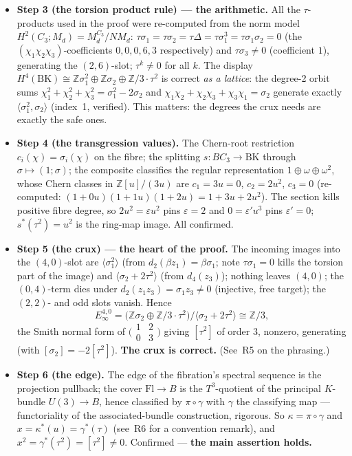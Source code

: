 \documentclass[11pt,a4paper]{article}
\newcommand{\Z}{\mathbb{Z}}
\newcommand{\BK}{\mathrm{BK}}
\newcommand{\Fl}{\mathrm{Fl}}
\begin{document}
\begin{itemize}[leftmargin=1.4em,itemsep=2pt]
\item \textbf{Step 3 (the torsion product rule) --- the arithmetic.} All the
$\tau$-products used in the proof were re-computed from the norm model
$H^2(C_3;M_d)=M_d^{C_3}/NM_d$: $\tau\sigma_1=\tau\sigma_2=\tau\Delta=
\tau\sigma_1^3=\tau\sigma_1\sigma_2=0$ (the $(\chi_1\chi_2\chi_3)$-coefficients
$0,0,0,6,3$ respectively) and $\tau\sigma_3\ne0$ (coefficient $1$),
generating the $(2,6)$-slot; $\tau^k\ne0$ for all $k$. The display
$H^4(\BK)\cong\Z\sigma_1^2\oplus\Z\sigma_2\oplus\Z/3\cdot\tau^2$ is correct
\emph{as a lattice}: the degree-2 orbit sums
$\chi_1^2+\chi_2^2+\chi_3^2=\sigma_1^2-2\sigma_2$ and
$\chi_1\chi_2+\chi_2\chi_3+\chi_3\chi_1=\sigma_2$ generate exactly
$\langle\sigma_1^2,\sigma_2\rangle$ (index~1, verified). This matters: the
degrees the crux needs are exactly the safe ones.

\item \textbf{Step 4 (the transgression values).} The Chern-root restriction
$c_i(\chi)=\sigma_i(\chi)$ on the fibre; the splitting $s\colon BC_3\to\BK$
through $\sigma\mapsto(1;\sigma)$; the composite classifies the regular
representation $1\oplus\omega\oplus\omega^2$, whose Chern classes in
$\Z[u]/(3u)$ are $c_1=3u=0$, $c_2=2u^2$, $c_3=0$ (re-computed:
$(1+0u)(1+1u)(1+2u)=1+3u+2u^2$). The section kills positive fibre degree, so
$2u^2=\varepsilon u^2$ pins \textbf{$\varepsilon=2$} and $0=\varepsilon'u^3$
pins \textbf{$\varepsilon'=0$}; $s^*(\tau^2)=u^2$ is the ring-map image. All
confirmed.

\item \textbf{Step 5 (the crux) --- the heart of the proof.} The incoming
images into the $(4,0)$-slot are $\langle\sigma_1^2\rangle$ (from
$d_2(\beta z_1)=\beta\sigma_1$; note $\tau\sigma_1=0$ kills the torsion part
of the image) and $\langle\sigma_2+2\tau^2\rangle$ (from $d_4(z_3)$); nothing
leaves $(4,0)$; the $(0,4)$-term dies under $d_2(z_1z_3)=\sigma_1z_3\ne0$
(injective, free target); the $(2,2)$- and odd slots vanish. Hence
\[
E_\infty^{4,0}=\bigl(\Z\sigma_2\oplus\Z/3\cdot\tau^2\bigr)
\big/\langle\sigma_2+2\tau^2\rangle\cong\Z/3,
\]
the Smith normal form of
$\bigl(\begin{smallmatrix}1&2\\0&3\end{smallmatrix}\bigr)$
giving $[\tau^2]$ of order $3$, nonzero, generating
(with $[\sigma_2]=-2[\tau^2]$). \textbf{The crux is correct.} (See~R5 on the
phrasing.)

\item \textbf{Step 6 (the edge).} The edge of the fibration's spectral
sequence is the projection pullback; the cover $\Fl\to B$ is the
$T^3$-quotient of the principal $K$-bundle $U(3)\to B$, hence classified by
$\pi\circ\gamma$ with $\gamma$ the classifying map --- functoriality of the
associated-bundle construction, rigorous. So $\kappa=\pi\circ\gamma$ and
$x=\kappa^*(u)=\gamma^*(\tau)$ (see~R6 for a convention remark), and
$x^2=\gamma^*(\tau^2)=[\tau^2]\ne0$. Confirmed --- \textbf{the main assertion
holds.}


\end{itemize}
\end{document}
